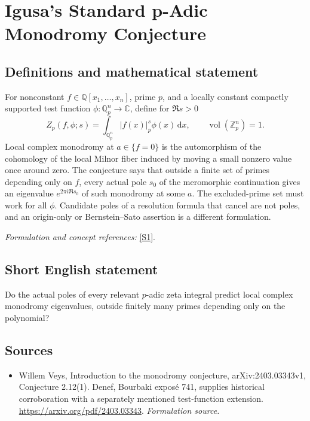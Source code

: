 \documentclass[11pt]{article}
\begin{document}
\section*{\texorpdfstring{Igusa’s Standard p-Adic Monodromy Conjecture}{Igusa’s Standard p-Adic Monodromy Conjecture}}\label{367}
\subsection{Definitions and mathematical statement}
For nonconstant $f\in{\mathbb{Q}}[x_1,\ldots,x_n]$, prime $p$, and a locally constant compactly supported test function $\phi:{\mathbb{Q}}_p^n\to{\mathbb{C}}$, define for $\Re s>0$
\[
 Z_p(f,\phi;s)=\int_{{\mathbb{Q}}_p^n}|f(x)|_p^s\phi(x){\,\mathrm{d}} x,
 \qquad\operatorname{vol}({\mathbb{Z}}_p^n)=1.
\]
Local complex monodromy at $a\in\{f=0\}$ is the automorphism of the cohomology of the local Milnor fiber induced by moving a small nonzero value once around zero. The conjecture says that outside a finite set of primes depending only on $f$, every actual pole $s_0$ of the meromorphic continuation gives an eigenvalue $e^{2\pi i\Re s_0}$ of such monodromy at some $a$. The excluded-prime set must work for all $\phi$. Candidate poles of a resolution formula that cancel are not poles, and an origin-only or Bernstein--Sato assertion is a different formulation.
\par\smallskip\textit{Formulation and concept references:} \href{https://arxiv.org/pdf/2403.03343}{[S1]}.

\subsection{Short English statement}
Do the actual poles of every relevant $p$-adic zeta integral predict local complex monodromy eigenvalues, outside finitely many primes depending only on the polynomial?
\subsection{Sources}
\begin{itemize}
\item[S1]Willem Veys, Introduction to the monodromy conjecture, arXiv:2403.03343v1, Conjecture 2.12(1). Denef, Bourbaki exposé 741, supplies historical corroboration with a separately mentioned test-function extension.
\url{https://arxiv.org/pdf/2403.03343}.
\textit{Formulation source.}
\end{itemize}
\end{document}
